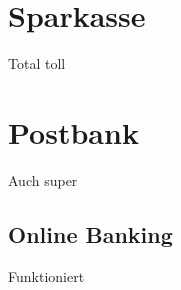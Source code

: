 \section{Sparkasse}
Total toll

\section{Postbank}
Auch super

\subsection{Online Banking}
Funktioniert
